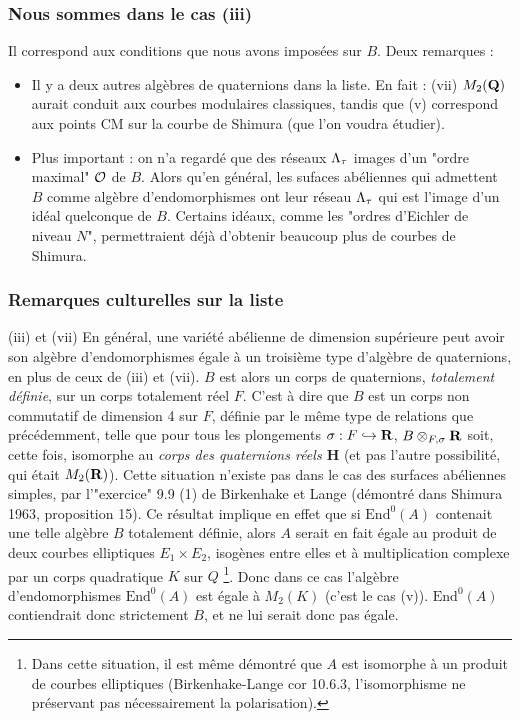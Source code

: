 \documentclass[a4paper, 12pt]{article}
\newcommand*\bit{\begin{itemize}} \newcommand\eit{\end{itemize}} \renewcommand*\i{\item}
\newcommand{\End}{\mathrm{End}} \DeclareMathOperator*{\trd}{trd} \DeclareMathOperator*{\nrd}{nrd}
\begin{document}
\begin{itemize}
\subsubsection*{Nous sommes dans le cas (iii)}
Il correspond aux conditions que nous avons impos\'ees sur $B$. Deux remarques :\bit
\i Il y a deux autres alg\`ebres de quaternions dans la liste. En fait : (vii) $M_2(\mathbf{Q})$ aurait conduit aux courbes modulaires classiques, tandis que (v) correspond aux points CM sur la courbe de Shimura (que l'on voudra \'etudier).
\i Plus important : on n'a regard\'e que des r\'eseaux $\Lambda_\tau$ images d'un "ordre maximal" $\mathcal{O}$ de $B$. Alors qu'en g\'en\'eral, les sufaces ab\'eliennes qui admettent $B$ comme algèbre d'endomorphismes ont leur r\'eseau $\Lambda_\tau$ qui est l'image d'un id\'eal quelconque de $B$. Certains id\'eaux, comme les "ordres d'Eichler de niveau $N$", permettraient d\'ej\`a d'obtenir beaucoup plus de courbes de Shimura.
\eit
\subsubsection*{Remarques culturelles sur la liste}
(iii) et (vii) En g\'en\'eral, une vari\'et\'e ab\'elienne de dimension sup\'erieure peut avoir son alg\`ebre d'endomorphismes \'egale \`a un troisi\`eme type d'alg\`ebre de quaternions, en plus de ceux de (iii) et (vii). $B$ est alors un corps de quaternions, \emph{totalement d\'efinie}, sur un corps totalement r\'eel $F$. C'est \`a dire que $B$ est un corps non commutatif de dimension 4 sur $F$, d\'efinie par le m\^eme type de relations que pr\'ec\'edemment, telle que pour tous les plongements $\sigma : F \hookrightarrow \mathbf{R}$, $B\otimes_{F,\sigma}\mathbf{R}$ soit, cette fois, isomorphe au \emph{corps des quaternions r\'eels $\mathbf{H}$} (et pas l'autre possibilit\'e, qui \'etait $M_2(\mathbf{R})$). Cette situation n'existe pas dans le cas des surfaces ab\'eliennes simples, par l'"exercice" 9.9 (1) de Birkenhake et Lange (d\'emontr\'e dans Shimura 1963, proposition 15). Ce r\'esultat implique en effet que si $\End^0(A)$ contenait une telle alg\`ebre $B$ totalement d\'efinie, alors $A$ serait en fait \'egale au produit de deux courbes elliptiques $E_1\times E_2$, isog\`enes entre elles et \`a multiplication complexe par un corps quadratique $K$ sur $Q$
\footnote{Dans cette situation, il est m\^eme d\'emontr\'e que $A$ est isomorphe \`a un produit de courbes elliptiques (Birkenhake-Lange cor 10.6.3, l'isomorphisme ne pr\'eservant pas n\'ecessairement la polarisation).}. Donc dans ce cas l'alg\`ebre d'endomorphismes $\End^0(A)$ est \'egale \`a $M_2(K)$ (c'est le cas (v)). $\End^0(A)$ contiendrait donc strictement $B$, et ne lui serait donc pas \'egale.


\end{itemize}
\end{document}
